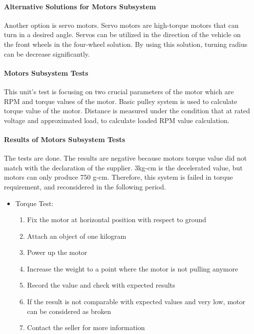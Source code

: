 \documentclass[a4paper,12pt]{article}
\begin{document}
	\paragraph{Alternative Solutions for Motors Subsystem}
	Another option is servo motors. Servo motors are high-torque motors that can turn in a desired angle. Servos can be utilized in the direction of the vehicle on the front wheels in the four-wheel solution. By using this solution, turning radius can be decrease significantly.
	 
	\paragraph{Motors Subsystem Tests}
	This unit’s test is focusing on two crucial parameters of the motor which are RPM and torque values of the motor. 
	Basic pulley system is used to calculate torque value of the motor.
	Distance is measured under the condition that at rated voltage and approximated load, to calculate loaded RPM value calculation.
	
	\paragraph{Results of Motors Subsystem Tests}
	The tests are done. The results are negative because motors torque value did not match with the declaration of the supplier. 3kg-cm is the decelerated value, but motors can only produce 750 g-cm. Therefore, this system is failed in torque requirement, and reconsidered in the following period. \\

		\begin{itemize}
			\item {Torque Test:} 
				\begin{enumerate}
					\item Fix the motor at horizontal position with respect to ground \vspace{-0.2cm}
					\item Attach an object of one kilogram \vspace{-0.2cm}
					\item Power up the motor \vspace{-0.2cm}
					\item Increase the weight to a point where the motor is not pulling anymore \vspace{-0.2cm}
					\item Record the value and check with expected results \vspace{-0.2cm}
					\item If the result is not comparable with expected values and very low, motor can be considered as broken \vspace{-0.2cm}
					\item Contact the seller for more information 
				\end{enumerate}
		\end{itemize}
	
\end{document}

